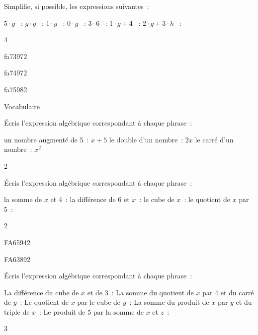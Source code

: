 \documentclass[a4paper,11pt]{report}
\begin{document}
\begin{exop}{Simplifie, si possible, les expressions suivantes~:
\begin{tasks}
    \task $5\cdot g$ ~:\hrulefill
    \task $g\cdot g$ ~:\hrulefill
    \task $1\cdot g$ ~:\hrulefill
    \task $0\cdot g$ ~:\hrulefill
    \task $3\cdot 6$ ~:\hrulefill
    \task $1\cdot g + 4$ ~:\hrulefill
    \task $2\cdot g + 3\cdot h$ ~:\hrulefill
\end{tasks}
}
{4}
\end{exop}

\begin{exof}{fa73}{97}{2}
\end{exof}
\begin{exof}{fa74}{97}{2}
\end{exof}
\begin{exof}{fa75}{98}{2}
\end{exof}

\begin{resolu}{Vocabulaire}{Écris l'expression algébrique correspondant à chaque phrase~:
		\vspace{-0.3cm}
\begin{tasks}[after-item-skip = 0.2em]
    \task un nombre augmenté de 5~: $x+5$
    \task le double d'un nombre~: $2x$
    \task le carré d'un nombre~: $x^2$
\end{tasks}
\vspace{-0.3cm}
}
{2}
\end{resolu}

\begin{exop}{Écris l'expression algébrique correspondant à chaque phrase~:
		\vspace{-0.3cm}
\begin{tasks}[after-item-skip = 0.3em]
    \task la somme de $x$ et 4~: \hrulefill
     \task  la différence de 6 et $x$~: \hrulefill
     \task  le cube de $x$~: \hrulefill
    \task  le quotient de $x$ par 5~: \hrulefill
\end{tasks}
\vspace{-0.3cm}
}
{2}
\end{exop}

\begin{exof}{FA65}{94}{2}
\end{exof}

\begin{exol}{FA63}{89}{2}
\end{exol}

\begin{exop}{ Écris l'expression algébrique correspondant à chaque phrase~:
		\vspace{-0.3cm}
\begin{tasks}[after-item-skip = 0.3em]
    \task La différence du cube de $x$ et de 3~: \hrulefill
    \task La somme du quotient de $x$ par 4 et du carré de $y$~: \hrulefill
     \task  Le quotient de $x$ par le cube de $y$~: \hrulefill
     \task  La somme du produit de $x$ par $y$ et du triple de $x$~: \hrulefill
    \task  Le produit de 5 par la somme de $x$ et $z$~: \hrulefill
\end{tasks}
\vspace{-0.3cm}
}
{3}
\end{exop}
\end{document}
